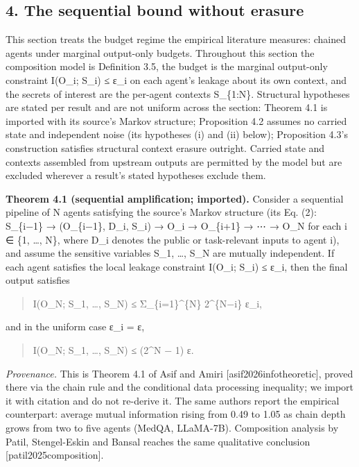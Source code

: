 \documentclass[
  11pt,
]{article}
\begin{document}
\subsection{4. The sequential bound without
erasure}\label{the-sequential-bound-without-erasure}

This section treats the budget regime the empirical literature measures:
chained agents under marginal output-only budgets. Throughout this
section the composition model is Definition 3.5, the budget is the
marginal output-only constraint I(O\_i; S\_i) ≤ ε\_i on each agent's
leakage about its own context, and the secrets of interest are the
per-agent contexts S\_\{1:N\}. Structural hypotheses are stated per
result and are not uniform across the section: Theorem 4.1 is imported
with its source's Markov structure; Proposition 4.2 assumes no carried
state and independent noise (its hypotheses (i) and (ii) below);
Proposition 4.3's construction satisfies structural context erasure
outright. Carried state and contexts assembled from upstream outputs are
permitted by the model but are excluded wherever a result's stated
hypotheses exclude them.

\textbf{Theorem 4.1 (sequential amplification; imported).} Consider a
sequential pipeline of N agents satisfying the source's Markov structure
(its Eq. (2): S\_\{i−1\} → (O\_\{i−1\}, D\_i, S\_i) → O\_i → O\_\{i+1\}
→ ⋯ → O\_N for each i ∈ \{1, \ldots, N\}, where D\_i denotes the public
or task-relevant inputs to agent i), and assume the sensitive variables
S\_1, \ldots, S\_N are mutually independent. If each agent satisfies the
local leakage constraint I(O\_i; S\_i) ≤ ε\_i, then the final output
satisfies

\begin{quote}
I(O\_N; S\_1, \ldots, S\_N) ≤ Σ\_\{i=1\}\^{}\{N\} 2\^{}\{N−i\} ε\_i,
\end{quote}

and in the uniform case ε\_i = ε,

\begin{quote}
I(O\_N; S\_1, \ldots, S\_N) ≤ (2\^{}N − 1) ε.
\end{quote}

\emph{Provenance.} This is Theorem 4.1 of Asif and Amiri
{[}asif2026infotheoretic{]}, proved there via the chain rule and the
conditional data processing inequality; we import it with citation and
do not re-derive it. The same authors report the empirical counterpart:
average mutual information rising from 0.49 to 1.05 as chain depth grows
from two to five agents (MedQA, LLaMA-7B). Composition analysis by
Patil, Stengel-Eskin and Bansal reaches the same qualitative conclusion
{[}patil2025composition{]}.
\end{document}
